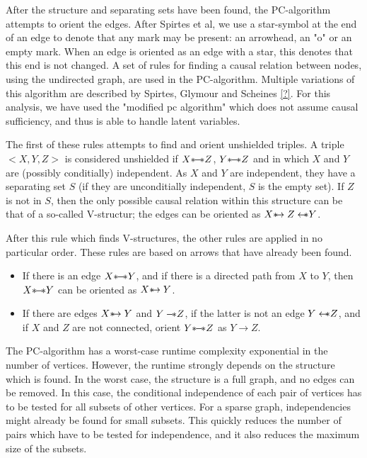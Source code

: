 \documentclass[a4paper, 10pt, english, onecolumn]{article}
\def \srightarrow {\text{\textasteriskcentered}\hspace{-0.62em}\rightarrow}
\def \sleftarrow {\leftarrow\hspace{-0.62em}\text{\textasteriskcentered}}
\def \sleftline {-\hspace{-0.40em}\text{\textasteriskcentered}}
\def \sline {\text{\textasteriskcentered}\hspace{-0.38em}-\hspace{-0.4em}\text{\textasteriskcentered}}
\begin{document}
After the structure and separating sets have been found, the PC-algorithm attempts to orient the edges.
After Spirtes et al, we use a star-symbol at the end of an edge to denote that any mark may be present: an arrowhead, an "o" or an empty mark.
When an edge is oriented as an edge with a star, this denotes that this end is not changed.
A set of rules for finding a causal relation between nodes, using the undirected graph, are used in the PC-algorithm. Multiple variations of this algorithm are described by Spirtes, Glymour and Scheines \ref{?}. For this analysis, we have used the "modified pc algorithm" which does not assume causal sufficiency, and thus is able to handle latent variables.

The first of these rules attempts to find and orient unshielded triples.
A triple $<X, Y, Z>$ is considered unshielded if $X \sline Z$, $Y \sline Z$ and in which $X$ and $Y$ are (possibly conditially) independent.
As $X$ and $Y$ are independent, they have a separating set $S$ (if they are unconditially independent, $S$ is the empty set).
If $Z$ is not in $S$, then the only possible causal relation within this structure can be that of a so-called V-structur; the edges can be oriented as $X \srightarrow Z \sleftarrow Y$.

After this rule which finds V-structures, the other rules are applied in no particular order. These rules are based on arrows that have already been found.
\begin{itemize}
\item If there is an edge $X \sline Y$, and if there is a directed path from $X$ to $Y$, then $X \sline Y$ can be oriented as $X \srightarrow Y$.
\item If there are edges $X \srightarrow Y$ and $Y \sleftline Z$, if the latter is not an edge $Y \sleftarrow Z$, and if $X$ and $Z$ are not connected, orient $Y \sline Z$ as $Y \rightarrow Z$. 
\end{itemize}

The PC-algorithm has a worst-case runtime complexity exponential in the number of vertices.
However, the runtime strongly depends on the structure which is found.
In the worst case, the structure is a full graph, and no edges can be removed.
In this case, the conditional independence of each pair of vertices has to be tested for all subsets of other vertices.
For a sparse graph, independencies might already be found for small subsets.
This quickly reduces the number of pairs which have to be tested for independence, and it also reduces the maximum size of the subsets.
\end{document}
